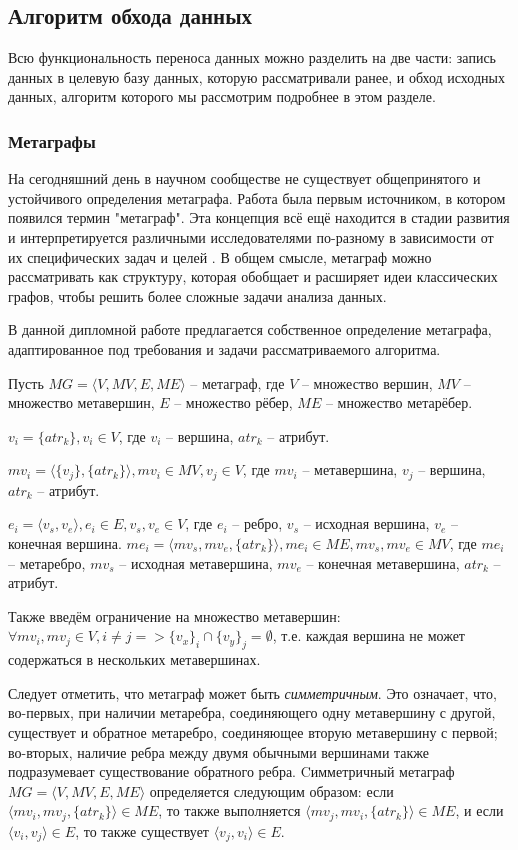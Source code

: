 \subsection{Алгоритм обхода данных}

Всю функциональность переноса данных можно разделить на две части: запись данных в целевую базу данных, которую рассматривали ранее, и обход исходных данных, алгоритм которого мы рассмотрим подробнее в этом разделе.

\subsubsection{Метаграфы}
На сегодняшний день в научном сообществе не существует общепринятого и устойчивого определения метаграфа. Работа \cite{metagraphs_1} была первым источником, в котором появился термин "метаграф". Эта концепция всё ещё находится в стадии развития и интерпретируется различными исследователями по-разному в зависимости от их специфических задач и целей \cite{metagraphs_2, metagraphs_3, metagraphs_4, metagraphs_5}. В общем смысле, метаграф можно рассматривать как структуру, которая обобщает и расширяет идеи классических графов, чтобы решить более сложные задачи анализа данных.

В данной дипломной работе предлагается собственное определение метаграфа, адаптированное под требования и задачи рассматриваемого алгоритма.

Пусть $MG = \langle V, MV, E, ME \rangle$ -- метаграф, где $V$ -- множество вершин, $MV$ -- множество метавершин, $E$ -- множество рёбер, $ME$ -- множество метарёбер.

$v_i = \{atr_k\}, v_i \in V$, где $v_i$ -- вершина, $atr_k$ -- атрибут.

$mv_i = \langle \{v_j\}, \{atr_k\} \rangle, mv_i \in MV, v_j \in V$, где $mv_i$ -- метавершина, $v_j$ -- вершина, $atr_k$ -- атрибут.

$e_i = \langle v_s, v_e \rangle, e_i \in E, v_s, v_e \in V$, где $e_i$ -- ребро, $v_s$ -- исходная вершина, $v_e$ -- конечная вершина.
$me_i = \langle mv_s, mv_e, \{atr_k\} \rangle, me_i \in ME, mv_s, mv_e \in MV$, где $me_i$ -- метаребро, $mv_s$ -- исходная метавершина, $mv_e$ -- конечная метавершина, $atr_k$ -- атрибут.

Также введём ограничение на множество метавершин: $\forall mv_i, mv_j \in V, i \neq j => \{v_x\}_i \cap \{v_y\}_j = \emptyset$, т.е. каждая вершина не может содержаться в нескольких метавершинах.

Следует отметить, что метаграф может быть \textit{симметричным}. Это означает, что, во-первых, при наличии метаребра, соединяющего одну метавершину с другой, существует и обратное метаребро, соединяющее вторую метавершину с первой; во-вторых, наличие ребра между двумя обычными вершинами также подразумевает существование обратного ребра. Cимметричный метаграф $MG = \langle V, MV, E, ME \rangle$ определяется следующим образом: если $\langle mv_i, mv_j, \{atr_k\} \rangle \in ME$, то также выполняется $\langle mv_j, mv_i, \{atr_k\} \rangle \in ME$, и если $\langle v_i, v_j \rangle \in E$, то также существует $\langle v_j, v_i \rangle \in E$.

